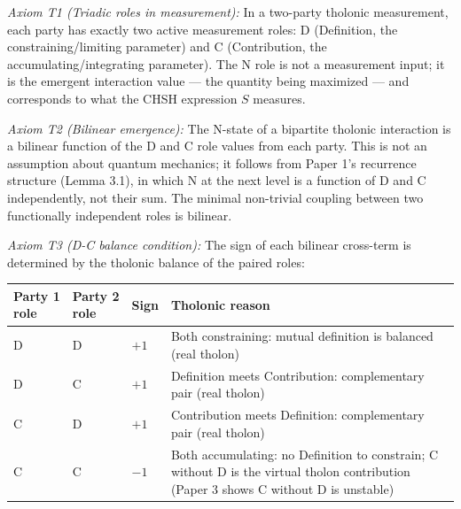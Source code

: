 \documentclass[12pt]{article}
\begin{document}
\emph{Axiom T1 (Triadic roles in measurement):} In a two-party tholonic
measurement, each party has exactly two active measurement roles: D
(Definition, the constraining/limiting parameter) and C (Contribution,
the accumulating/integrating parameter). The N role is not a measurement
input; it is the emergent interaction value --- the quantity being
maximized --- and corresponds to what the CHSH expression \(S\)
measures.

\emph{Axiom T2 (Bilinear emergence):} The N-state of a bipartite
tholonic interaction is a bilinear function of the D and C role values
from each party. This is not an assumption about quantum mechanics; it
follows from Paper 1's recurrence structure (Lemma 3.1), in which N at
the next level is a function of D and C independently, not their sum.
The minimal non-trivial coupling between two functionally independent
roles is bilinear.

\emph{Axiom T3 (D-C balance condition):} The sign of each bilinear
cross-term is determined by the tholonic balance of the paired roles:

\begin{longtable}[]{@{}
  >{\centering\arraybackslash}p{}
  >{\centering\arraybackslash}p{}
  >{\centering\arraybackslash}p{}
  >{\raggedright\arraybackslash}p{}@{}}
\toprule\noalign{}
\begin{minipage}[b]{\linewidth}\centering
Party 1 role
\end{minipage} & \begin{minipage}[b]{\linewidth}\centering
Party 2 role
\end{minipage} & \begin{minipage}[b]{\linewidth}\centering
Sign
\end{minipage} & \begin{minipage}[b]{\linewidth}\raggedright
Tholonic reason
\end{minipage} \\
\midrule\noalign{}
\endhead
\bottomrule\noalign{}
\endlastfoot
D & D & \(+1\) & Both constraining: mutual definition is balanced (real
tholon) \\
D & C & \(+1\) & Definition meets Contribution: complementary pair (real
tholon) \\
C & D & \(+1\) & Contribution meets Definition: complementary pair (real
tholon) \\
C & C & \(-1\) & Both accumulating: no Definition to constrain; C
without D is the virtual tholon contribution (Paper 3 shows C without D
is unstable) \\
\end{longtable}
\end{document}

